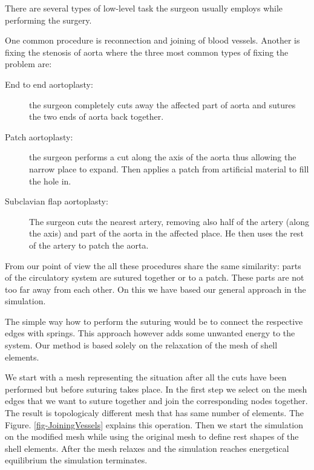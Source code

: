 There are several types of low-level task the surgeon usually employs while
performing the surgery.

One common procedure is reconnection and joining of blood vessels. Another
is fixing the stenosis of aorta where the three most common types of fixing
the problem are:

\begin{description}

  \item[End to end aortoplasty:] the surgeon completely cuts away the
    affected part of aorta and sutures the two ends of aorta back together.

  \item[Patch aortoplasty:] the surgeon performs a cut along the axis of
    the aorta thus allowing the narrow place to expand. Then applies a
    patch from artificial material to fill the hole in.

  \item[Subclavian flap aortoplasty:] The surgeon cuts the nearest artery,
    removing also half of the artery (along the axis) and part of the
    aorta in the affected place. He then uses the rest of the artery to
    patch the aorta.

\end{description}

From our point of view the all these procedures share the same similarity:
parts of the circulatory system are sutured together or to a patch. These
parts are not too far away from each other. On this we have based our
general approach in the simulation.

The simple way how to perform the suturing would be to connect the
respective edges with springs. This approach however adds some unwanted
energy to the system. Our method is based solely on the relaxation of the
mesh of shell elements.

We start with a mesh representing the situation after all the cuts have
been performed but before suturing takes place. In the first step we select
on the mesh edges that we want to suture together and join the
corresponding nodes together. The result is topologicaly different mesh
that has same number of elements. The Figure. \ref{fig-JoiningVessels} explains
this operation. Then we start the simulation on the modified mesh while
using the original mesh to define rest shapes of the shell elements. After
the mesh relaxes and the simulation reaches energetical equilibrium the
simulation terminates.

